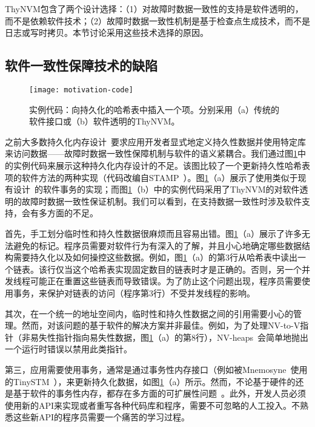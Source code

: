 ThyNVM包含了两个设计选择：（1）对故障时数据一致性的支持是软件透明的，而不是依赖软件技术；（2）故障时数据一致性机制是基于检查点生成技术，而不是日志或写时拷贝。本节讨论采用这些技术选择的原因。

\subsection{软件一致性保障技术的缺陷}

\begin{figure}[!h]
\centering \texttt{[image: motivation-code]}
  \caption{实例代码：向持久化的哈希表中插入一个项。分别采用（a）传统的软件接口或（b）软件透明的ThyNVM。}
\label{fig:motivation-code}
\end{figure}

之前大多数持久化内存设计~\cite{Condit:2009:BIT:1629575.1629589, Volos:2011:MLP:1950365.1950379, Coburn:2011:NMP:1950365.1950380, Zhao:2013:KCP:2540708.2540744, Venkataraman:2011:CDD:1960475.1960480}要求应用开发者显式地定义持久性数据并使用特定库来访问数据——故障时数据一致性保障机制与软件的语义紧耦合。我们通过图\ref{fig:motivation-code}中的实例代码来展示这种持久化内存设计的不足。该图比较了一个更新持久性哈希表项的软件方法的两种实现（代码改编自STAMP~\cite{Cao:2008:STA}）。图\ref{fig:motivation-code}（a）展示了使用类似于现有设计~\cite{Condit:2009:BIT:1629575.1629589, Volos:2011:MLP:1950365.1950379}的软件事务的实现；而图\ref{fig:motivation-code}（b）中的实例代码采用了ThyNVM的对软件透明的故障时数据一致性保证机制。我们可以看到，在支持数据一致性时涉及软件支持，会有多方面的不足。

首先，手工划分临时性和持久性数据很麻烦而且容易出错。图\ref{fig:motivation-code}（a）展示了许多无法避免的标记。程序员需要对软件行为有深入的了解，并且小心地确定哪些数据结构需要持久化以及如何操控这些数据。例如，图\ref{fig:motivation-code}（a）的第3行从哈希表中读出一个链表。该行仅当这个哈希表实现固定数目的链表时才是正确的。否则，另一个并发线程可能正在重置这些链表而导致错误。为了防止这个问题出现，程序员需要使用事务，来保护对链表的访问（程序第3行）不受并发线程的影响。

其次，在一个统一的地址空间内，临时性和持久性数据之间的引用需要小心的管理。然而，对该问题的基于软件的解决方案并非最佳。例如，为了处理NV-to-V指针（非易失性指针指向易失性数据，图\ref{fig:motivation-code}（a）的第8行），NV-heaps~\cite{Coburn:2011:NMP:1950365.1950380}会简单地抛出一个运行时错误以禁用此类指针。

第三，应用需要使用事务，通常是通过事务性内存接口（例如被Mnemosyne~\cite{Volos:2011:MLP:1950365.1950379}使用的TinySTM~\cite{Felber:2008:DPT}），来更新持久化数据，如图\ref{fig:motivation-code}（a）所示。然而，不论基于硬件的还是基于软件的事务性内存，都存在多方面的可扩展性问题~\cite{Cascaval:2008:STM:1454456.1454466, Pankratius:2011:STM:1989493.1989500, Dice:2009:EEC:1508244.1508263}。此外，开发人员必须使用新的API来实现或者重写各种代码库和程序，需要不可忽略的人工投入。不熟悉这些新API的程序员需要一个痛苦的学习过程。

